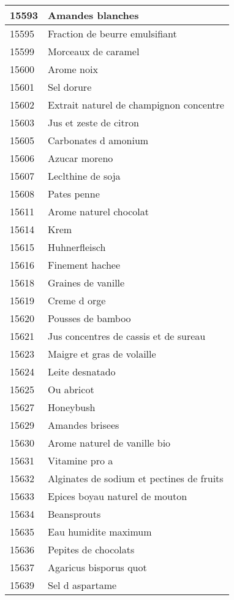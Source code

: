 \begin{longtable}{|l|l|}
15593 & Amandes blanches \\ \hline 
15595 & Fraction de beurre emulsifiant \\ \hline 
15599 & Morceaux de caramel \\ \hline 
15600 & Arome noix \\ \hline 
15601 & Sel dorure \\ \hline 
15602 & Extrait naturel de champignon concentre \\ \hline 
15603 & Jus et zeste de citron \\ \hline 
15605 & Carbonates d amonium \\ \hline 
15606 & Azucar moreno \\ \hline 
15607 & Leclthine de soja \\ \hline 
15608 & Pates penne \\ \hline 
15611 & Arome naturel chocolat \\ \hline 
15614 & Krem \\ \hline 
15615 & Huhnerfleisch \\ \hline 
15616 & Finement hachee \\ \hline 
15618 & Graines de vanille \\ \hline 
15619 & Creme d orge \\ \hline 
15620 & Pousses de bamboo \\ \hline 
15621 & Jus concentres de cassis et de sureau \\ \hline 
15623 & Maigre et gras de volaille \\ \hline 
15624 & Leite desnatado \\ \hline 
15625 & Ou abricot \\ \hline 
15627 & Honeybush \\ \hline 
15629 & Amandes brisees \\ \hline 
15630 & Arome naturel de vanille bio \\ \hline 
15631 & Vitamine pro a \\ \hline 
15632 & Alginates de sodium et pectines de fruits \\ \hline 
15633 & Epices boyau naturel de mouton \\ \hline 
15634 & Beansprouts \\ \hline 
15635 & Eau humidite maximum \\ \hline 
15636 & Pepites de chocolats \\ \hline 
15637 & Agaricus bisporus quot \\ \hline 
15639 & Sel d aspartame \\ \hline 

\end{longtable}

